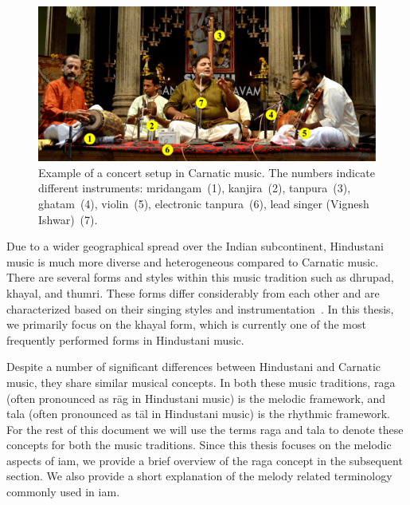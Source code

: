 \begin{figure}
	\begin{center}
		\includegraphics[width=\figSizeHundred]{ch02_background/figures/VigneshConcert.pdf}
	\end{center}
	\caption[Example of a concert setup in Carnatic music]{Example of a concert setup in Carnatic music. The numbers indicate different instruments: \gls{mridangam}~(1), \gls{kanjira}~(2), \gls{tanpura}~(3), \gls{ghatam}~(4), violin~(5), electronic \gls{tanpura}~(6), lead singer (Vignesh Ishwar)~(7).}
	\label{fig:concert_picture}
\end{figure}



Due to a wider geographical spread over the Indian subcontinent, Hindustani music is much more diverse and heterogeneous compared to Carnatic music. There are several forms and styles within this music tradition such as \gls{dhrupad}, \gls{khayal}, and \gls{thumri}. These forms differ considerably from each other and are characterized based on their singing styles and instrumentation~\citep{Bor2010}. In this thesis, we primarily focus on the \gls{khayal} form, which is currently one of the most frequently performed forms in Hindustani music. 

Despite a number of significant differences between Hindustani and Carnatic music, they share similar musical concepts. In both these music traditions, \gls{raga} (often pronounced as r\={a}g in Hindustani music) is the melodic framework, and \gls{tala} (often pronounced as t\={a}l in Hindustani music) is the rhythmic framework. For the rest of this document we will use the terms \gls{raga} and \gls{tala} to denote these concepts for both the music traditions. Since this thesis focuses on the melodic aspects of \gls{iam}, we provide a brief overview of the \gls{raga} concept in the subsequent section. We also provide a short explanation of the melody related terminology commonly used in \gls{iam}. 


